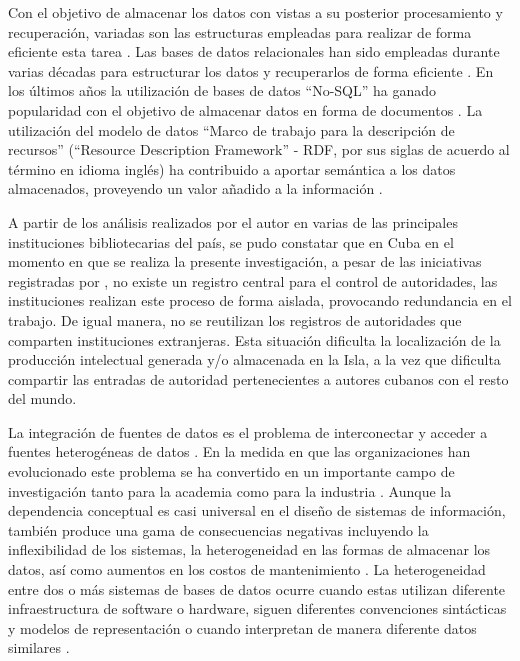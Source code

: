 Con el objetivo de almacenar los datos con vistas a su posterior procesamiento y recuperación, variadas son las estructuras empleadas para realizar de forma eficiente esta tarea \citep{Gutierrez2011,Vavliakis2013,Lacasta2013}. Las bases de datos relacionales han sido empleadas durante varias décadas para estructurar los datos y recuperarlos de forma eficiente \citep{maier1983theory,Shanmugasundaram1999,Ilyas2004,Spanos2012}. En los últimos años la utilización de bases de datos ``No-SQL'' ha ganado popularidad con el objetivo de almacenar datos en forma de documentos \citep{Pokorny2013,Moniruzzaman2013}. La utilización del modelo de datos ``Marco de trabajo para la descripción de recursos'' (``Resource Description Framework'' - RDF, por sus siglas de acuerdo al término en idioma inglés) ha contribuido a aportar semántica a los datos almacenados, proveyendo un valor añadido a la información \citep{Berners-Lee2001,Konstantinou2014,Sule2016}.

A partir de los análisis realizados por el autor en varias de las principales instituciones bibliotecarias del país, se pudo constatar que en Cuba en el momento en que se realiza la presente investigación, a pesar de las iniciativas registradas por \cite{GarciaRodriguez2016}, no existe un registro central para el control de autoridades, las instituciones realizan este proceso de forma aislada, provocando redundancia en el trabajo. De igual manera, no se reutilizan los registros de autoridades que comparten instituciones extranjeras. Esta situación dificulta la localización de la producción intelectual generada y/o almacenada en la Isla, a la vez que dificulta compartir las entradas de autoridad pertenecientes a autores cubanos con el resto del mundo.

La integración de fuentes de datos es el problema de interconectar y acceder a fuentes heterogéneas de datos \citep{Nachouki2011}. En la medida en que las organizaciones han evolucionado este problema se ha convertido en un importante campo de investigación tanto para la academia como para la industria \citep{Nachouki2011}. Aunque la dependencia conceptual es casi universal en el diseño de sistemas de información, también produce una gama de consecuencias negativas incluyendo la inflexibilidad de los sistemas, la heterogeneidad en las formas de almacenar los datos, así como aumentos en los costos de mantenimiento \citep{McGinnes2015}. La heterogeneidad entre dos o más sistemas de bases de datos ocurre cuando estas utilizan diferente infraestructura de software o hardware, siguen diferentes convenciones sintácticas y modelos de representación o cuando interpretan de manera diferente datos similares \citep{Spanos2012}.

